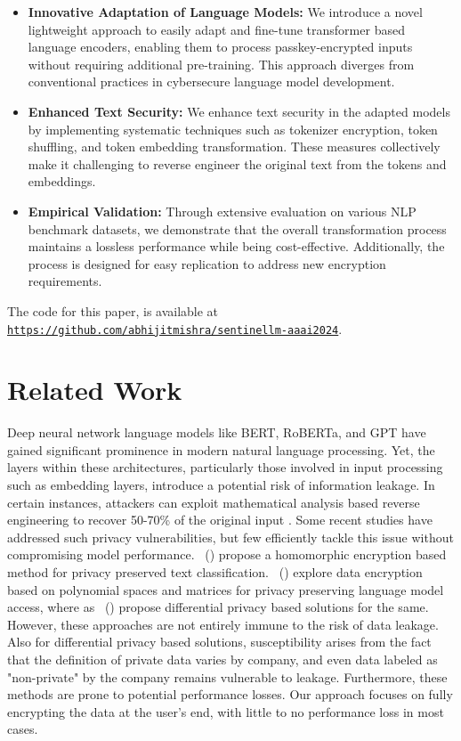 \documentclass[letterpaper]{article} %
\begin{document}
\begin{itemize}
    \item \textbf{Innovative Adaptation of Language Models:} We introduce a novel lightweight approach to easily adapt and fine-tune transformer based language encoders, enabling them to process passkey-encrypted inputs without requiring additional pre-training. This approach diverges from conventional practices in cybersecure language model development.
    \item{\textbf{Enhanced Text Security:}} We enhance text security in the adapted models by implementing systematic techniques such as tokenizer encryption, token shuffling, and token embedding transformation. These measures collectively make it challenging to reverse engineer the original text from the tokens and embeddings.
    \item{\textbf{Empirical Validation:}} Through extensive evaluation on various NLP benchmark datasets, we demonstrate that the overall transformation process maintains a lossless performance while being cost-effective. Additionally, the process is designed for easy replication to address new encryption requirements.
\end{itemize}

The code for this paper, is available at \texttt{\url{https://github.com/abhijitmishra/sentinellm-aaai2024}}.

\section{Related Work}
\label{sec:related}
Deep neural network language models like BERT, RoBERTa, and GPT have gained significant prominence in modern natural language processing. Yet, the layers within these architectures, particularly those involved in input processing such as embedding layers, introduce a potential risk of information leakage. In certain instances, attackers can exploit mathematical analysis based reverse engineering to recover 50-70\% of the original input \cite{song2020information}. Some recent studies have addressed such privacy vulnerabilities, but few efficiently tackle this issue without compromising model performance. \citeauthor{lee2022privacy}~(\citeyear{lee2022privacy}) propose a homomorphic encryption based method for privacy preserved text classification. \citeauthor{raeini2023privacy}~(\citeyear{raeini2023privacy}) explore data encryption based on polynomial spaces and matrices for privacy preserving language model access, where as \citeauthor{yu2021differentially}~(\citeyear{yu2021differentially}) propose differential privacy based solutions for the same. However, these approaches are not entirely immune to the risk of data leakage. Also for differential privacy based solutions, susceptibility arises from the fact that the definition of private data varies by company, and even data labeled as "non-private" by the company remains vulnerable to leakage. Furthermore, these methods are prone to potential performance losses. Our approach focuses on fully encrypting the data at the user's end, with little to no performance loss in most cases.
\end{document}
